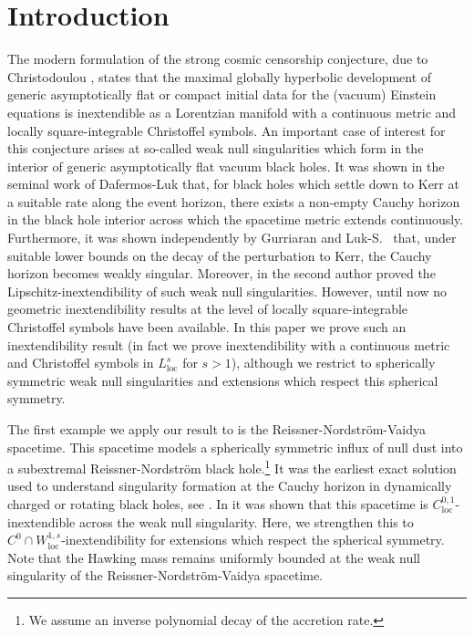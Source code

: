 \documentclass{article}
\newcommand{\loc}{\mathrm{loc}}
\begin{document}
\section{Introduction}\label{Introduction}
The modern formulation of the strong cosmic censorship conjecture, due to Christodoulou \cite{Chris09}, states that the maximal globally hyperbolic development of generic asymptotically flat or compact initial data for the (vacuum) Einstein equations is inextendible as a Lorentzian manifold with a continuous metric and locally square-integrable Christoffel symbols. An important case of interest for this conjecture arises at so-called weak null singularities which form in the interior of generic asymptotically flat vacuum black holes. It was shown in the seminal work of Dafermos-Luk \cite{DafLuk17, DafLuk26} that, for black holes which settle down to Kerr at a suitable rate along the event horizon, there exists a non-empty Cauchy horizon in the black hole interior across which the spacetime metric extends continuously. Furthermore, it was shown independently by Gurriaran \cite{Gurriaran.nonlinear} and Luk-S.\ \cite{LukSbie26} that, under suitable lower bounds on the decay of the perturbation to Kerr, the Cauchy horizon becomes weakly singular. Moreover, in \cite{SbieLip} the second author proved the Lipschitz-inextendibility of such weak null singularities. However, until now no geometric inextendibility results at the level of locally square-integrable Christoffel symbols have been available.
In this paper we prove such an inextendibility result (in fact we prove inextendibility with a continuous metric and Christoffel symbols in $L^s_{\loc}$ for $s>1$), although we restrict to spherically symmetric weak null singularities and  extensions which respect this spherical symmetry. %

The first example we apply our result to is the Reissner-Nordstr\"{o}m-Vaidya spacetime. This spacetime models a spherically symmetric influx of null dust into a subextremal Reissner-Nordstr\"{o}m black hole.\footnote{We assume an inverse polynomial decay of the accretion rate.} It was the earliest exact solution used to understand singularity formation at the Cauchy horizon in dynamically charged or rotating black holes, see \cite{Hiscock1981}. In \cite{Sbie22a} it was shown that this spacetime is $C^{0,1}_{\loc}$-inextendible across the weak null singularity. Here, we strengthen this to $C^0 \cap W^{1,s}_{\loc}$-inextendibility for extensions which respect the spherical symmetry. Note that the Hawking mass remains uniformly bounded at the weak null singularity of the Reissner-Nordstr\"om-Vaidya spacetime.
\end{document}
